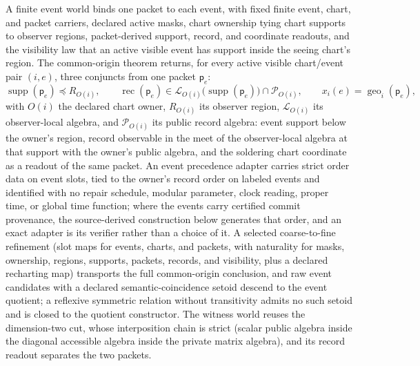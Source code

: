 \documentclass[11pt]{article}
\theoremstyle{remark}
\theoremstyle{plain}
\begin{document}
A finite event world binds one packet to each event, with fixed finite
event, chart, and packet carriers, declared active masks, chart ownership
tying chart supports to observer regions, packet-derived support, record,
and coordinate readouts, and the visibility law that an active visible
event has support inside the seeing chart's region. The common-origin
theorem returns, for every active visible chart/event pair \((i,e)\),
three conjuncts from one packet \(\mathsf p_e\):
\[
\operatorname{supp}(\mathsf p_e)\preceq R_{O(i)},\qquad
\operatorname{rec}(\mathsf p_e)\in
\mathcal L_{O(i)}\!\bigl(\operatorname{supp}(\mathsf p_e)\bigr)\cap
\mathcal P_{O(i)},\qquad
x_i(e)=\operatorname{geo}_i(\mathsf p_e),
\]
with \(O(i)\) the declared chart owner, \(R_{O(i)}\) its observer region,
\(\mathcal L_{O(i)}\) its observer-local algebra, and
\(\mathcal P_{O(i)}\) its public record algebra: event support below the
owner's region, record observable in the meet of the observer-local
algebra at that support with the owner's public algebra, and the
soldering chart coordinate as a readout of the same packet. An event
precedence adapter
carries strict order data on event slots, tied to the owner's record order
on labeled events and identified with no repair schedule, modular
parameter, clock reading, proper time, or global time function; where the
events carry certified commit provenance, the source-derived construction
below generates that order, and an exact adapter is its verifier rather
than a choice of it. A selected
coarse-to-fine refinement (slot maps for events, charts, and packets, with
naturality for masks, ownership, regions, supports, packets, records, and
visibility, plus a declared recharting map) transports the full
common-origin conclusion, and raw event candidates with a declared
semantic-coincidence setoid descend to the event quotient; a reflexive
symmetric relation without transitivity admits no such setoid and is
closed to the quotient constructor. The witness world reuses the
dimension-two cut, whose interposition chain is strict (scalar public
algebra inside the diagonal accessible algebra inside the private matrix
algebra), and its record readout separates the two packets.
\end{document}
